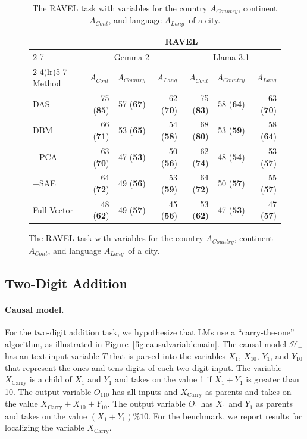 \documentclass{article}
\theoremstyle{plain}
\theoremstyle{definition}
\theoremstyle{remark}
\newcommand{\carry}{X_{\text{Carry}}}
\newcommand{\continent}{$A_{\mathit{Cont}}$}
\newcommand{\country}{$A_{\mathit{Country}}$}
\newcommand{\lang}{$A_{\mathit{Lang}}$}
\newcommand{\inputvar}{T}
\begin{document}
\begin{table}[t]
\begin{subfigure}[b]{\textwidth}
\centering
  \begin{tabular}{lrrrrrr}
    \toprule
     & \multicolumn{6}{c}{RAVEL} \\
    \cmidrule(lr){2-7}
 & \multicolumn{3}{c}{Gemma-2} & \multicolumn{3}{c}{Llama-3.1} \\
    \cmidrule(lr){2-4}\cmidrule(lr){5-7}
    Method & \continent & \country & \lang& \continent & \country & \lang\\
    \midrule
    DAS & 75 (\textbf{85}) & 57 (\textbf{67}) & 62 (\textbf{70}) & 75 (\textbf{83}) & 58 (\textbf{64}) & 63 (\textbf{70}) \\
    DBM & 66 (\textbf{71}) & 53 (\textbf{65}) & 54 (\textbf{58}) & 68 (\textbf{80}) & 53 (\textbf{59}) & 58 (\textbf{64}) \\
    +PCA & 63 (\textbf{70}) & 47 (\textbf{53}) & 50 (\textbf{56}) & 62 (\textbf{74}) & 48 (\textbf{54}) & 53 (\textbf{57}) \\
    +SAE & 64 (\textbf{72}) & 49 (\textbf{56}) & 53 (\textbf{59}) & 64 (\textbf{72}) & 50 (\textbf{57}) & 55 (\textbf{57}) \\
    Full Vector & 48 (\textbf{62}) & 49 (\textbf{57}) & 45 (\textbf{56}) & 53 (\textbf{62}) & 47 (\textbf{53}) & 47 (\textbf{57}) \\
    \bottomrule
  \end{tabular}
  \caption{The RAVEL task with variables for the country \country, continent \continent, and language \lang\ of a city. }
  \label{tab:results-ravel}
\end{subfigure}

\end{table}

\subsection{Two-Digit Addition}
\paragraph{Causal model.}
For the two-digit addition task, we hypothesize that LMs use a ``carry-the-one'' algorithm, as illustrated in Figure~\ref{fig:causalvariablemain}. The causal model $\mathcal{H}_+$ has an text input variable $\inputvar$  that is parsed into the variables $X_1$, $X_{10}$, $Y_1$, and $Y_{10}$ that represent the ones and tens digits of each two-digit input. The variable $\carry$ is a child of $X_1$ and $Y_1$ and takes on the value 1 if $X_1 + Y_1$ is greater than 10. The output variable $O_{110}$ has all inputs and $\carry$ as parents and takes on the value $\carry + X_{10} + Y_{10}$. The output variable $O_{1}$ has $X_1$ and $Y_1$ as parents and takes on the value $(X_1 + Y_1)\%10$. For the benchmark, we report results for localizing the variable $\carry$.
\end{document}
